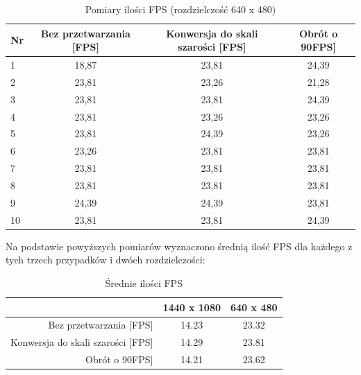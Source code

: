 \documentclass[a4paper,11pt,twoside]{report}
\theoremstyle{definition}
\begin{document}
\begin{description}
\begin{table}[H]
\centering
\label{my-label}
\begin{tabular}{lccc}
Nr & Bez przetwarzania {[}FPS{]} & Konwersja do skali szarości {[}FPS{]} & Obrót o 90\textdegree {[}FPS{]} \\ \hline
1  & 18,87                       & 23,81                                 & 24,39                           \\
2  & 23,81                       & 23,26                                 & 21,28                           \\
3  & 23,81                       & 23,81                                 & 24,39                           \\
4  & 23,81                       & 23,26                                 & 23,26                           \\
5  & 23,81                       & 24,39                                 & 23,26                           \\
6  & 23,26                       & 23,81                                 & 23,81                           \\
7  & 23,81                       & 23,81                                 & 23,81                           \\
8  & 23,81                       & 23,81                                 & 23,81                           \\
9  & 24,39                       & 24,39                                 & 23,81                           \\
10 & 23,81                       & 23,81                                 & 24,39                           \\ 
\end{tabular}
\caption{Pomiary ilości FPS (rozdzielczość 640 x 480)}
\end{table}

Na podstawie powyższych pomiarów wyznaczono średnią ilość FPS dla każdego z tych trzech przypadków i dwóch rozdzielczości:

\begin{table}[H]
\centering
\begin{tabular}{r|cc}
\multicolumn{1}{l|}{}                 & 1440 x 1080 & 640 x 480 \\ \hline
Bez przetwarzania {[}FPS{]}           & 14.23       & 23.32     \\
Konwersja do skali szarości {[}FPS{]} & 14.29       & 23.81     \\
Obrót o 90\textdegree {[}FPS{]}       & 14.21       & 23.62    
\end{tabular}
\caption{Średnie ilości FPS}
\end{table}


\end{description}
\end{document}
